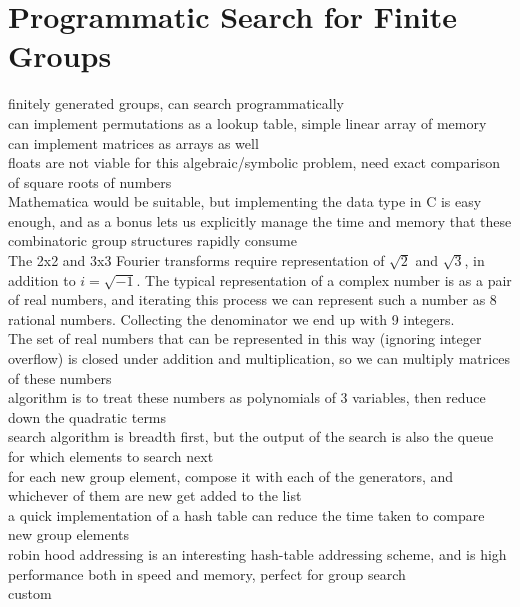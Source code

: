 \section{Programmatic Search for Finite Groups}
finitely generated groups, can search programmatically
\\can implement permutations as a lookup table, simple linear array of memory
\\can implement matrices as arrays as well
\\floats are not viable for this algebraic/symbolic problem, need exact comparison of square roots of numbers
\\Mathematica would be suitable, but implementing the data type in C is easy enough, and as a bonus lets us explicitly manage the time and memory that these combinatoric group structures rapidly consume
\\The 2x2 and 3x3 Fourier transforms require representation of $\sqrt{2}$ and $\sqrt{3}$, in addition to $i = \sqrt{-1}$. The typical representation of a complex number is as a pair of real numbers, and iterating this process we can represent such a number as 8 rational numbers. Collecting the denominator we end up with 9 integers.
\\The set of real numbers that can be represented in this way (ignoring integer overflow) is closed under addition and multiplication, so we can multiply matrices of these numbers
\\algorithm is to treat these numbers as polynomials of 3 variables, then reduce down the quadratic terms
\\search algorithm is breadth first, but the output of the search is also the queue for which elements to search next
\\for each new group element, compose it with each of the generators, and whichever of them are new get added to the list
\\a quick implementation of a hash table can reduce the time taken to compare new group elements
\\robin hood addressing is an interesting hash-table addressing scheme, and is high performance both in speed and memory, perfect for group search
\\custom 

